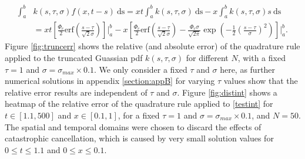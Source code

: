 \begin{equation}
    \begin{split}
\int_a^b&k(s,\tau,\sigma)f(x,t-s)\ \text{ds}=xt\int_a^bk(s,\tau,\sigma)\ \text{ds}-x\int_a^bk(s,\tau,\sigma)s\ \text{ds}\\&=xt\left[\frac{\Phi_c}{2}\text{erf}\left(\frac{s-\tau}{\sqrt{2}\sigma}\right)\right]\bigg|_a^b-x\left[\frac{\Phi_c}{2}\text{erf}\left(\frac{s-\tau}{\sqrt{2}\sigma}\right)-\frac{\Phi_c\sigma}{\sqrt{2\pi}}\exp\left(-\frac{1}{2}\left(\frac{s-\tau}{\sigma}\right)^2 \right)\right]\bigg|_a^b.
    \end{split}
\end{equation}
Figure \ref{fig:truncerr} shows the relative (and absolute error) of the quadrature rule applied to the truncated Guassian pdf $k(s,\tau,\sigma)$ for different $N$, with a fixed $\tau=1$ and $\sigma=\sigma_{max}\times0.1$. We only consider a fixed $\tau$ and $\sigma$ here, as further numerical solutions in appendix \ref{section:appB} for varying $\tau$ values show that the relative error results are independent of $\tau$ and $\sigma$. Figure \ref{fig:distint} shows a heatmap of the relative error of the quadrature rule applied to \eqref{testint} for $t\in[1.1,500]$ and $x\in[0.1,1]$, for a fixed $\tau=1$ and $\sigma=\sigma_{max}\times0.1$, and $N=50$. The spatial and temporal domains were chosen to discard the effects of catastrophic cancellation, which is caused by very small solution values for $0\leq t\leq 1.1$ and $0\leq x\leq 0.1$.

